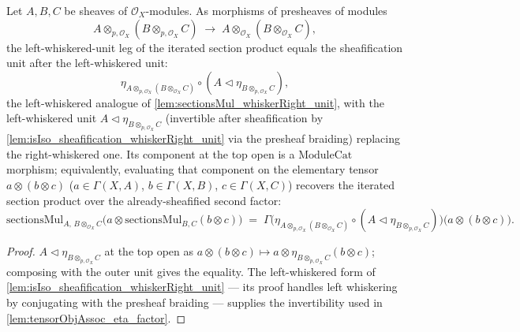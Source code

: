 \begin{lemma}\leanok
  \label{lem:sectionsMul_whiskerLeft_unit}
  Let \(A, B, C\) be sheaves of \(\mathcal{O}_X\)-modules. As morphisms of
  presheaves of modules
  \[
    A \otimes_{p,\mathcal{O}_X} (B \otimes_{p,\mathcal{O}_X} C)
      \;\longrightarrow\;
    A \otimes_{\mathcal{O}_X} (B \otimes_{\mathcal{O}_X} C),
  \]
  the left-whiskered-unit leg of the iterated section product equals the
  sheafification unit after the left-whiskered unit:
  \[
    \eta_{A \otimes_{p,\mathcal{O}_X} (B \otimes_{\mathcal{O}_X} C)}
      \circ (A \lhd \eta_{B \otimes_{p,\mathcal{O}_X} C}),
  \]
  the left-whiskered analogue of \cref{lem:sectionsMul_whiskerRight_unit}, with the
  left-whiskered unit \(A \lhd \eta_{B \otimes_{p,\mathcal{O}_X} C}\) (invertible
  after sheafification by \cref{lem:isIso_sheafification_whiskerRight_unit} via the
  presheaf braiding) replacing the right-whiskered one. Its component at the
  top open is a \(\mathrm{ModuleCat}\) morphism; equivalently, evaluating that
  component on the elementary tensor \(a \otimes (b \otimes c)\)
  (\(a \in \Gamma(X,A)\), \(b \in \Gamma(X,B)\), \(c \in \Gamma(X,C)\)) recovers the
  iterated section product over the already-sheafified second factor:
  \[
    \mathrm{sectionsMul}_{A,\, B \otimes_{\mathcal{O}_X} C}\bigl(
      a \otimes \mathrm{sectionsMul}_{B,C}(b \otimes c)\bigr)
    \;=\;
    \Gamma\bigl(
      \eta_{A \otimes_{p,\mathcal{O}_X} (B \otimes_{\mathcal{O}_X} C)}
        \circ (A \lhd \eta_{B \otimes_{p,\mathcal{O}_X} C})
    \bigr)\bigl(a \otimes (b \otimes c)\bigr).
  \]
\end{lemma}

\begin{proof}
  \leanok
  \(A \lhd \eta_{B \otimes_{p,\mathcal{O}_X} C}\) at the top open as
  \(a \otimes (b \otimes c) \mapsto a \otimes \eta_{B \otimes_{p,\mathcal{O}_X} C}(b \otimes c)\);
  composing with the outer unit gives the equality. The left-whiskered form of
  \cref{lem:isIso_sheafification_whiskerRight_unit} --- its proof handles left
  whiskering by conjugating with the presheaf braiding --- supplies the
  invertibility used in \cref{lem:tensorObjAssoc_eta_factor}.
\end{proof}

